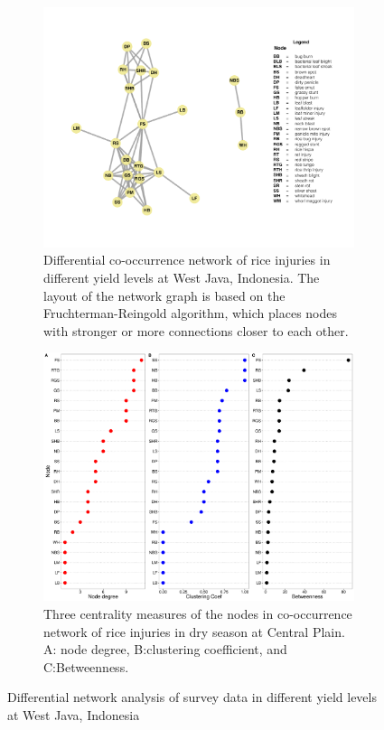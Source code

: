   
 \begin{figure}
    \centering
    \begin{subfigure}[b]{1\textwidth}
        \includegraphics[width = 1\textwidth]{figures/difyieldWJ.pdf}
        \caption[Differential co-occurrence network of rice injuries in different yield levels at West Java, Indonesia.]{Differential co-occurrence network of rice injuries in different yield levels at West Java, Indonesia. The layout of the network graph is based on the Fruchterman-Reingold algorithm, which places nodes with stronger or more connections closer to each other.}
        \label{fig:difyieldnetwork_WJ}
    \end{subfigure}
    \begin{subfigure}[b]{1\textwidth}
        \includegraphics[width = 1\textwidth]{figures/yield_dif_nodepropWest_Java.pdf}
        \caption{Three centrality measures of the nodes in co-occurrence network of rice injuries in dry season at Central Plain. A: node degree, B:clustering coefficient, and C:Betweenness.}
        \label{fig:nodepropdifyield_WJ}
    \end{subfigure}
    \caption{Differential network analysis of survey data in different yield levels at West Java, Indonesia}
    \label{fig:yielddif_WJ}
\end{figure}


